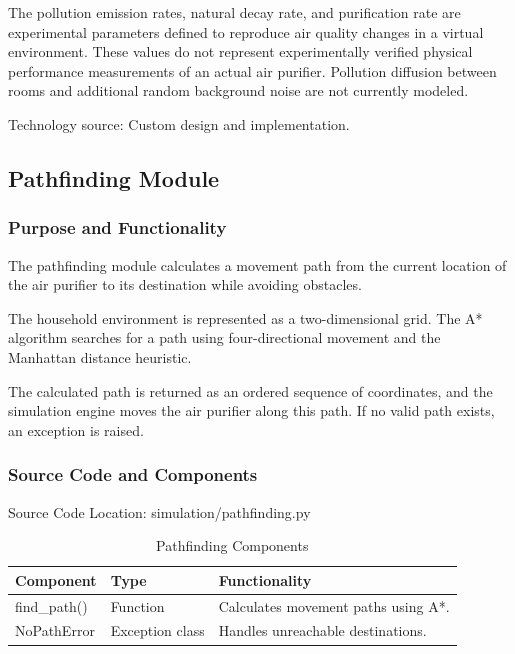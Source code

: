 \documentclass[conference]{IEEEtran}
\newlength{\tablebodywidth}
\begin{document}
The pollution emission rates, natural decay rate, and purification rate are experimental parameters defined to reproduce air quality changes in a virtual environment. These values do not represent experimentally verified physical performance measurements of an actual air purifier. Pollution diffusion between rooms and additional random background noise are not currently modeled.

Technology source: Custom design and implementation.

\subsection{Pathfinding Module \cite{ref12}}

\subsubsection{Purpose and Functionality}

The pathfinding module calculates a movement path from the current location of the air purifier to its destination while avoiding obstacles.

The household environment is represented as a two-dimensional grid. The A* algorithm searches for a path using four-directional movement and the Manhattan distance heuristic.

The calculated path is returned as an ordered sequence of coordinates, and the simulation engine moves the air purifier along this path. If no valid path exists, an exception is raised.

\subsubsection{Source Code and Components}

Source Code Location: simulation/pathfinding.py

\begin{table}[!t]
\caption{Pathfinding Components}
\label{tab:t21}
\centering\footnotesize
\setlength{\tabcolsep}{3pt}
\setlength{\tablebodywidth}{\dimexpr\columnwidth-18pt\relax}
\begin{tabular}{>{\raggedright\arraybackslash}p{0.370\tablebodywidth}>{\raggedright\arraybackslash}p{0.200\tablebodywidth}>{\raggedright\arraybackslash}p{0.430\tablebodywidth}}
\toprule
\textbf{Component} & \textbf{Type} & \textbf{Functionality} \\
\midrule
find\_\allowbreak{}path() & Function & Calculates movement paths using A*. \\
NoPathError & Exception class & Handles unreachable destinations. \\
\bottomrule
\end{tabular}
\end{table}
\end{document}
